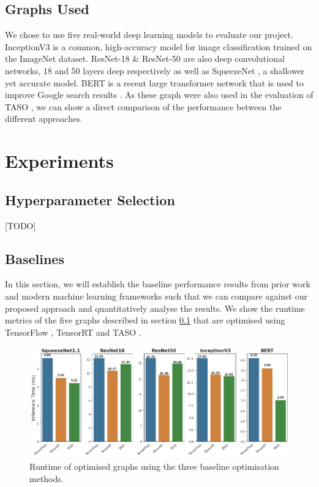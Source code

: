 \subsection{Graphs Used}
\label{sec:eval:subsec:graphsused}

We chose to use five real-world deep learning models to evaluate our project. InceptionV3 \cite{szegedy2015rethinking} is a common, high-accuracy model for image classification trained on the ImageNet dataset. ResNet-18 \& ResNet-50 \cite{he2015deep} are also deep convolutional networks, 18 and 50 layers deep respectively as well as SqueezeNet \cite{iandola2016squeezenet}, a shallower yet accurate model. BERT \cite{devlin2019bert} is a recent large transformer network that is used to improve Google search results \cite{nayak2019}. As these graph were also used in the evaluation of TASO \cite{jia2019taso}, we can show a direct comparison of the performance between the different approaches.

\section{Experiments}

\subsection{Hyperparameter Selection}
[TODO]

\subsection{Baselines}

In this section, we will establish the baseline performance results from prior work and modern machine learning frameworks such that we can compare against our proposed approach and quantitatively analyse the results. We show the runtime metrics of the five graphs described in section \ref{sec:eval:subsec:graphsused} that are optimised using TensorFlow \cite{tensorflow2015-whitepaper}, TensorRT \cite{tensorrt2017} and TASO \cite{jia2019taso}.


\begin{figure}[ht]
  \centering
  \includegraphics[width=1\columnwidth]{sections/5evaluation/images/baseline_runtimes.png}
  \caption[Baseline runtimes of optimised graphs]{Runtime of optimised graphs using the three baseline optimisation methods.}
  \label{fig:eval:baseline-runtimes}
\end{figure}

